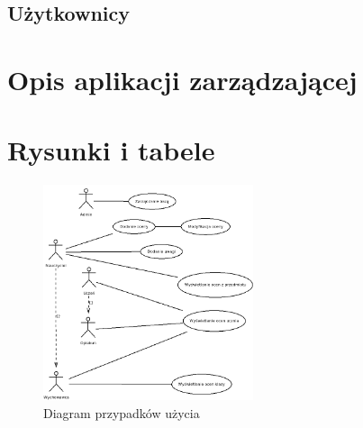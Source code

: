 \documentclass[10pt,a4paper,notitlepage]{article}
\begin{document}
\subsection{Użytkownicy}

\section{Opis aplikacji zarządzającej}

\section{Rysunki i tabele}
\begin{figure}[p]
\label{fig1}
\centering
\includegraphics[width=0.55\textwidth]{diagram_uzycia.png}
\caption{Diagram przypadków użycia}
\end{figure}
\end{document}
